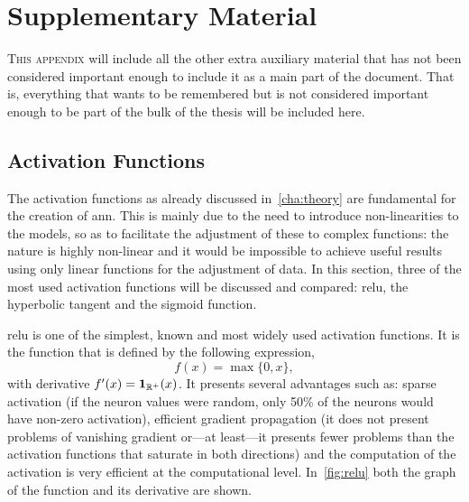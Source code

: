 

\chapter{Supplementary Material}\label{cha:extra}



\lettrine{T}{his appendix} will include all the other extra auxiliary material
that has not been considered important enough to include it as a main part of
the document. That is, everything that wants to be remembered but is not
considered important enough to be part of the bulk of the thesis will be
included here.



\section{Activation Functions}%
\label{sec:activation}

The activation functions as already discussed in\ \vref{cha:theory} are
fundamental for the creation of \gls{ann}. This is mainly due to the need to
introduce non-linearities to the models, so as to facilitate the adjustment of
these to complex functions: the nature is highly non-linear and it would be
impossible to achieve useful results using only linear functions for the
adjustment of data. In this section, three of the most used activation
functions will be discussed and compared: \gls{relu}, the hyperbolic
tangent and the sigmoid function.

\gls{relu} is one of the simplest, known and most widely used activation
functions. It is the function that is defined by the following expression,
\begin{equation}
  f(x) = \max\{0, x\},
\end{equation}
with derivative \(f^\prime(x) = \mathbf{1}_{\mathbb{R}^+}(x)\). It presents several
advantages such as: sparse activation (if the neuron values were random, only
50\% of the neurons would have non-zero activation), efficient gradient
propagation (it does not present problems of vanishing gradient or---at
least---it presents fewer problems than the activation functions that saturate
in both directions) and the computation of the activation is very efficient at
the computational level. In\ \vref{fig:relu} both the graph of the function and
its derivative are shown.

